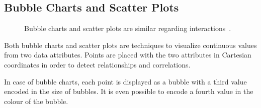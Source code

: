 \subsection{Bubble Charts and Scatter Plots}

\begin{figure}
  \centering
  \qquad
  \caption{Bubble charts and scatter plots are similar regarding interactions~\parencite{VisualizationCatalogue2017}.}%
  \label{fig:analysis:bubble-chart}
\end{figure}

Both bubble charts and scatter plots are techniques to visualize continuous values from two data attributes.
Points are placed with the two attributes in Cartesian coordinates in order to detect relationships and correlations.

In case of bubble charts, each point is displayed as a bubble with a third value encoded in the size of bubbles.
It is even possible to encode a fourth value in the colour of the bubble.

